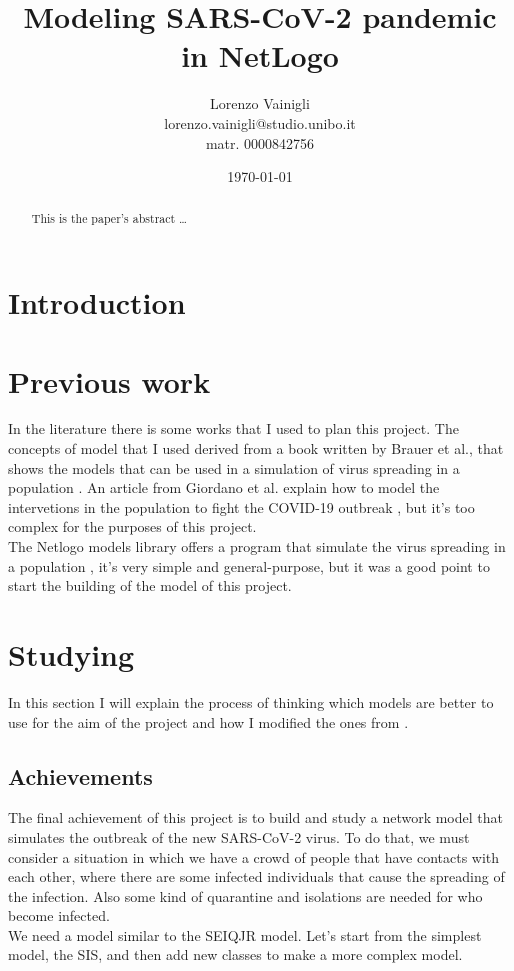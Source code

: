 \documentclass[12pt]{llncs}
\title{Modeling SARS-CoV-2 pandemic in NetLogo}
\author{Lorenzo Vainigli \\
lorenzo.vainigli@studio.unibo.it \\
matr. 0000842756}
\institute{Course of Complex Systems and Network Science \\
Laurea Magistrale in Informatica \\
University of Bologna \\
A.Y. 2020-2021}
\date{\today}
\begin{document}
\maketitle

\begin{abstract}
This is the paper's abstract \ldots
\end{abstract}

\section{Introduction}

\section{Previous work}\label{previous work}
In the literature there is some works that I used to plan this project. The concepts of model that I used derived from a book written by Brauer et al., that shows the models that can be used in a simulation of virus spreading in a population \cite{brauer}. An article from Giordano et al. explain how to model the intervetions in the population to fight the COVID-19 outbreak \cite{giordano}, but it's too complex for the purposes of this project.\\
The Netlogo \cite{netlogo} models library offers a program that simulate the virus spreading in a population \cite{netlogo-virus}, it's very simple and general-purpose, but it was a good point to start the building of the model of this project.

\section{Studying}
In this section I will explain the process of thinking which models are better to use for the aim of the project and how I modified the ones from \cite{brauer}.

\subsection{Achievements}
The final achievement of this project is to build and study a network model that simulates the outbreak of the new SARS-CoV-2 virus. To do that, we must consider a situation in which we have a crowd of people that have contacts with each other, where there are some infected individuals that cause the spreading of the infection. Also some kind of quarantine and isolations are needed for who become infected. \\
We need a model similar to the SEIQJR model. Let's start from the simplest model, the SIS, and then add new classes to make a more complex model.
\end{document}
